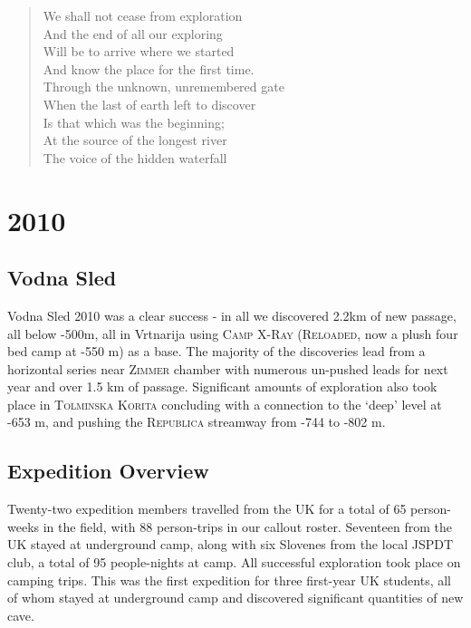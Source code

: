 
\begin{verse}
We shall not cease from exploration  \\
And the end of all our exploring  \\
Will be to arrive where we started  \\
And know the place for the first time.  \\
Through the unknown, unremembered gate  \\
When the last of earth left to discover  \\
Is that which was the beginning;  \\
At the source of the longest river  \\
The voice of the hidden waterfall \\
\end{verse}


\chapter{2010}

\section{Vodna Sled}

Vodna Sled 2010 was a clear success - in all we discovered 2.2km of new
passage, all below -500m, all in Vrtnarija using \textsc{Camp
X-Ray} (\textsc{Reloaded}, now a plush four bed camp at -550 m) as a
base. The majority of the discoveries lead from a horizontal series near
\textsc{Zimmer} chamber with numerous un-pushed leads for next year and
over 1.5 km of passage. Significant amounts of exploration also took
place in \textsc{Tolminska Korita} concluding with a connection to the
`deep' level at -653 m, and pushing the \textsc{Republica} streamway
from -744 to -802 m.

\section{Expedition Overview}

Twenty-two expedition members travelled from the UK for a total of 65
person-weeks in the field, with 88 person-trips in our callout roster.
Seventeen from the UK stayed at underground camp, along with six
Slovenes from the local JSPDT club, a total of 95 people-nights at camp.
All successful exploration took place on camping trips. This was the
first expedition for three first-year UK students, all of whom stayed at
underground camp and discovered significant quantities of new cave.

